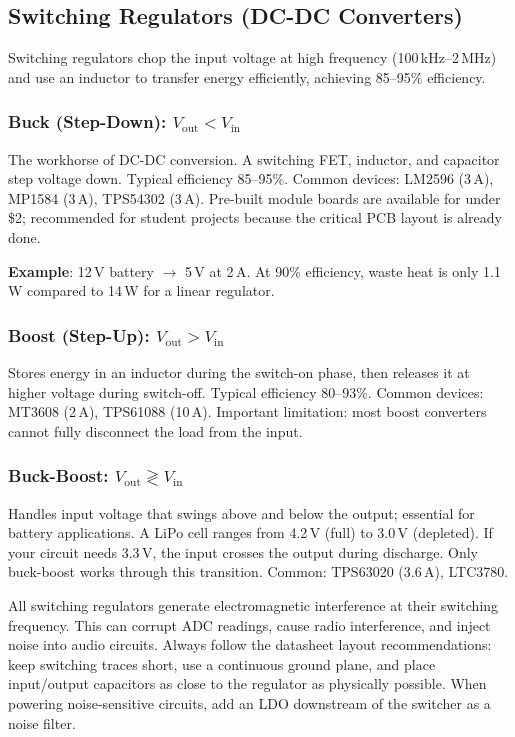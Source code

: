 \documentclass[11pt,letterpaper,twoside,openany]{book}
\begin{document}
\subsection{Switching Regulators (DC-DC Converters)}

Switching regulators chop the input voltage at high frequency (100\,kHz--2\,MHz) and use an inductor to transfer energy efficiently, achieving 85--95\% efficiency.

\subsubsection{Buck (Step-Down): $V_{\text{out}} < V_{\text{in}}$}

The workhorse of DC-DC conversion. A switching FET, inductor, and capacitor step voltage down. Typical efficiency 85--95\%. Common devices: LM2596 (3\,A), MP1584 (3\,A), TPS54302 (3\,A). Pre-built module boards are available for under \$2; recommended for student projects because the critical PCB layout is already done.

\textbf{Example}: 12\,V battery $\to$ 5\,V at 2\,A. At 90\% efficiency, waste heat is only 1.1\,W compared to 14\,W for a linear regulator.

\subsubsection{Boost (Step-Up): $V_{\text{out}} > V_{\text{in}}$}

Stores energy in an inductor during the switch-on phase, then releases it at higher voltage during switch-off. Typical efficiency 80--93\%. Common devices: MT3608 (2\,A), TPS61088 (10\,A). Important limitation: most boost converters cannot fully disconnect the load from the input.

\subsubsection{Buck-Boost: $V_{\text{out}} \gtrless V_{\text{in}}$}

Handles input voltage that swings above and below the output; essential for battery applications. A LiPo cell ranges from 4.2\,V (full) to 3.0\,V (depleted). If your circuit needs 3.3\,V, the input crosses the output during discharge. Only buck-boost works through this transition. Common: TPS63020 (3.6\,A), LTC3780.

\begin{warningbox}
All switching regulators generate electromagnetic interference at their switching frequency. This can corrupt ADC readings, cause radio interference, and inject noise into audio circuits. Always follow the datasheet layout recommendations: keep switching traces short, use a continuous ground plane, and place input/output capacitors as close to the regulator as physically possible. When powering noise-sensitive circuits, add an LDO downstream of the switcher as a noise filter.
\end{warningbox}
\end{document}
